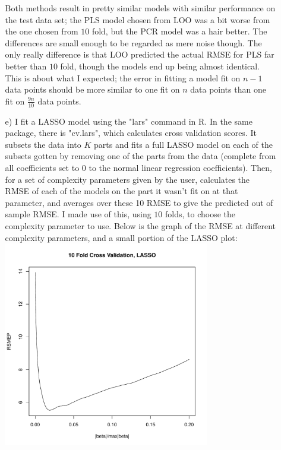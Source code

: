 \documentclass[11pt]{article}
\theoremstyle{definition}
\begin{document}
\begin{itemize}
\begin{itemize}
                Both methods result in pretty similar models with similar performance on the test data set; the PLS model chosen from LOO was a bit worse from the one chosen from $10$ fold, but the PCR model was a hair better. The differences are small enough to be regarded as mere noise though. The only really difference is that LOO predicted the actual RMSE for PLS far better than $10$ fold, though the models end up being almost identical. This is about what I expected; the error in fitting a model fit on $n-1$ data points should be more similar to one fit on $n$ data points than one fit on $\frac{9n}{10}$ data points.
            \item[e)]
                I fit a LASSO model using the "lars" command in R. In the same package, there is "cv.lars", which calculates cross validation scores. It subsets the data into $K$ parts and fits a full LASSO model on each of the subsets gotten by removing one of the parts from the data (complete from all coefficients set to 0 to the normal linear regression coefficients). Then, for a set of complexity parameters given by the user, calculates the RMSE of each of the models on the part it wasn't fit on at that parameter, and averages over these 10 RMSE to give the predicted out of sample RMSE. I made use of this, using $10$ folds, to choose the complexity parameter to use.
 Below is the graph of the RMSE at different complexity parameters, and a small portion of the LASSO plot: \\   
                \includegraphics[width=9cm]{final/3e_cv_plot}

\end{itemize}
\end{itemize}
\end{document}

